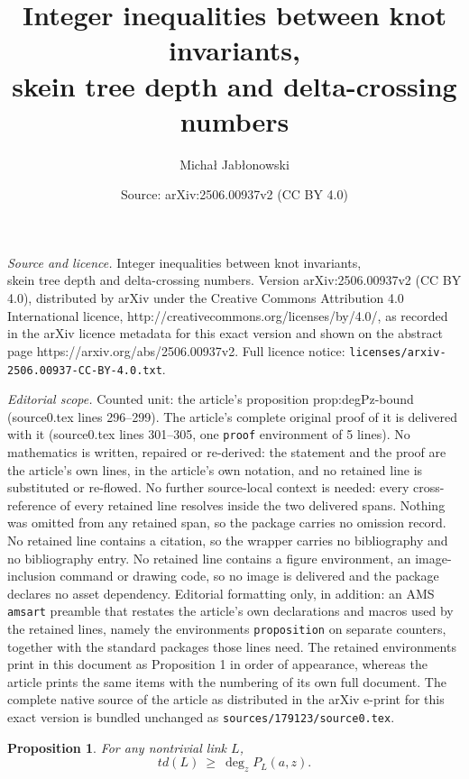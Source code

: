 \documentclass[10pt,a4paper]{amsart}
\title{Integer inequalities between knot invariants,\\ skein tree depth and delta-crossing numbers}
\author{Micha{\l} Jab{\l}onowski}
\date{Source: arXiv:2506.00937v2 (CC BY 4.0)}
\newtheorem{proposition}{Proposition}
\begin{document}
\maketitle

\noindent\emph{Source and licence.} Integer inequalities between knot invariants,\\ skein tree depth and delta-crossing numbers. Version arXiv:2506.00937v2 (CC BY 4.0), distributed by arXiv under the Creative Commons Attribution 4.0 International licence, http://creativecommons.org/licenses/by/4.0/, as recorded in the arXiv licence metadata for this exact version and shown on the abstract page https://arxiv.org/abs/2506.00937v2. Full licence notice: \texttt{licenses/arxiv-2506.00937-CC-BY-4.0.txt}.\par\smallskip

\noindent\textit{Editorial scope.} Counted unit: the article's proposition prop:degPz-bound (source0.tex lines 296--299). The article's complete original proof of it is delivered with it (source0.tex lines 301--305, one \texttt{proof} environment of 5 lines). No mathematics is written, repaired or re-derived: the statement and the proof are the article's own lines, in the article's own notation, and no retained line is substituted or re-flowed.  No further source-local context is needed: every cross-reference of every retained line resolves inside the two delivered spans.  Nothing was omitted from any retained span, so the package carries no omission record.  No retained line contains a citation, so the wrapper carries no bibliography and no bibliography entry.  No retained line contains a figure environment, an image-inclusion command or drawing code, so no image is delivered and the package declares no asset dependency.  Editorial formatting only, in addition: an AMS \texttt{amsart} preamble that restates the article's own declarations and macros used by the retained lines, namely the environments \texttt{proposition} on separate counters, together with the standard packages those lines need.  The retained environments print in this document as Proposition 1 in order of appearance, whereas the article prints the same items with the numbering of its own full document.  The complete native source of the article as distributed in the arXiv e-print for this exact version is bundled unchanged as \texttt{sources/179123/source0.tex}.
	\begin{proposition}\label{prop:degPz-bound}
		For any nontrivial link $L$, 
		\[ td(L)\ \ge\ \deg_z P_L(a,z). \]
	\end{proposition}
\end{document}
